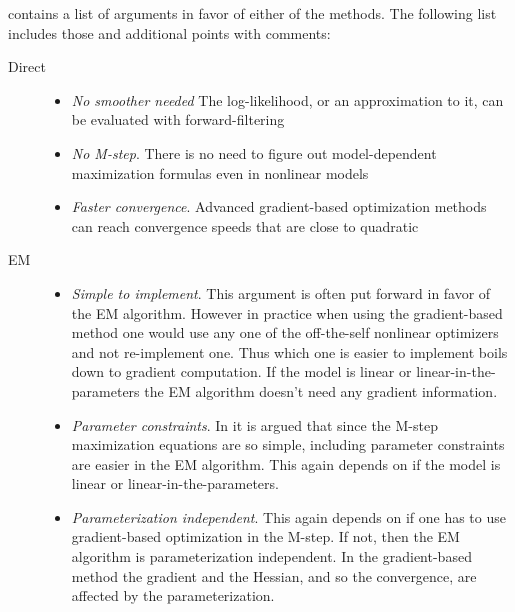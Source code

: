 \textcite{Cappe2005} contains a list of arguments in favor of either of the methods. The following list includes
those and additional points with comments:
\begin{description}
  \item[Direct]\hfill
\begin{itemize}
  \item\emph{No smoother needed} The log-likelihood, or an approximation to it, can be evaluated
  with forward-filtering
  \item\emph{No M-step}. There is no need to figure out model-dependent maximization
  formulas even in nonlinear models 
  \item\emph{Faster convergence}. Advanced gradient-based optimization
  methods can reach convergence speeds that are close to quadratic
\end{itemize}
  \item[EM]\hfill
  \begin{itemize}
  \item \emph{Simple to implement}. This argument is often put forward in favor of the EM
 algorithm. However in practice when using the gradient-based method one would use any one of
the off-the-self nonlinear optimizers and not re-implement one. Thus which one is easier to implement
boils down to gradient computation. If the model is linear or linear-in-the-parameters the EM
algorithm doesn't need any gradient information.
  \item\emph{Parameter constraints}. In \textcite{Cappe2005} it is argued that
since the M-step maximization equations are so simple, including parameter constraints
are easier in the EM algorithm. This again depends on if the model is linear or linear-in-the-parameters.
  \item\emph{Parameterization independent}. This again depends on if one has to use gradient-based
 optimization in the M-step. If not, then the EM algorithm is parameterization independent. In the gradient-based
 method the gradient and the Hessian, and so the convergence, are affected by the parameterization.
\end{itemize} 
\end{description}
 



